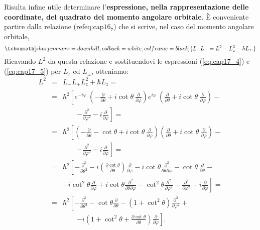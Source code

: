 Risulta infine utile determinare l'\textbf{espressione, nella rappresentazione delle coordinate, del quadrato del momento angolare orbitale}. È conveniente partire dalla relazione (refeq:cap$16_7$) che si scrive, nel caso del momento angolare orbitale,
	\begin{equation}
		\tcboxmath[sharp corners=downhill, colback=white, colframe=black]{
			L_- L_+ = L^2 -L_z ^2 -\hbar L_z .
			}
	\end{equation}
Ricavando $L^2$ da questa relazione e sostituendovi le espressioni (\ref{eq:cap17_4}) e (\ref{eq:cap17_5}) per $L_z$ ed $L_{\pm}$, otteniamo:
\begin{eqnarray}
L^2 &=& L_-L_+ L_z^2 +\hbar L_z = \nonumber \\
&=& \hbar ^2 \left[e^{-i\varphi}\ \left(-\frac{\partial}{\partial \theta}+i \cot \theta\ \frac{\partial}{\partial \varphi}\right)e^{i\varphi}\ \left(\frac{\partial}{\partial \theta}+i \cot \theta\ \frac{\partial}{\partial \varphi}\right)-\right. \nonumber \\
& &\qquad \left. -\frac{\partial ^2}{\partial \varphi ^2}- i\frac{\partial}{\partial \varphi}\right] = \nonumber \\
&=&\hbar ^ 2 \left[ \left( -\frac{\partial}{\partial \theta}-\cot\theta +i \cot\theta\ \frac{\partial}{\partial \varphi}\right)\left(\frac{\partial}{\partial \theta}+i \cot \theta \ \frac{\partial}{\partial \varphi}\right)-\right. \nonumber \\
& &\qquad \left. -\frac{\partial ^2}{\partial \varphi ^2}- i\frac{\partial}{\partial \varphi}\right] = \nonumber \\
&=& \hbar ^2 \left[ -\frac{\partial ^2}{\partial \theta ^2}-i\left( \frac{\partial \cot \theta}{\partial \theta}\right) \frac{\partial }{\partial \varphi }-i\cot \theta \frac{\partial ^2}{\partial \theta \partial \varphi}-\cot \theta\ \frac{\partial }{\partial \theta}-\right. \nonumber \\
& & \left. -i \cot ^2 \theta \frac{\partial }{\partial \varphi}+i \cot\theta \frac{\partial ^2}{\partial \theta \partial \varphi}-\cot ^2 \theta \frac{\partial ^2}{\partial \varphi ^2}-\frac{\partial ^2}{\partial \varphi ^2}-i\frac{\partial }{\partial \varphi}\right] = \nonumber \\
&=& \hbar^2 \left[ -\frac{\partial ^2}{\partial \theta ^2}-\cot \theta \frac{\partial }{\partial \theta}-\left(1+ \cot ^2 \theta\right) \frac{\partial ^2}{\partial \varphi ^2}+\right. \nonumber \\
& &\qquad \left. -i\left( 1+\cot ^2 \theta +\frac{\partial \cot \theta}{\partial \theta}\right)\frac{\partial}{\partial \varphi}\right] .
\end{eqnarray}
